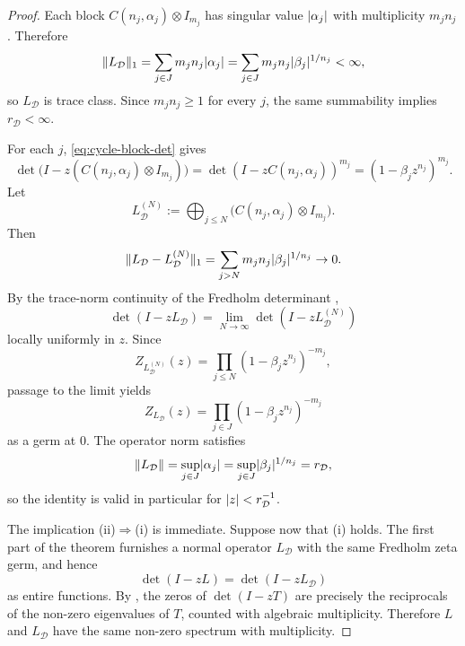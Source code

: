 \begin{proof}
  Each block \(C(n_j,\alpha_j)\otimes I_{m_j}\) has singular value
  \(\lvert \alpha_j \rvert\) with multiplicity \(m_jn_j\). Therefore
  \[
    \|L_{\mathcal D}\|_1
    =\sum_{j\in J}m_jn_j\lvert \alpha_j \rvert
    =\sum_{j\in J}m_jn_j\lvert \beta_j \rvert^{1/n_j}
    <\infty,
  \]
  so \(L_{\mathcal D}\) is trace class. Since \(m_jn_j\ge 1\) for every
  \(j\), the same summability implies
  \(
    r_{\mathcal D}<\infty
  \).

  For each \(j\), \eqref{eq:cycle-block-det} gives
  \[
    \det\!\bigl(I-z(C(n_j,\alpha_j)\otimes I_{m_j})\bigr)
    =\det(I-zC(n_j,\alpha_j))^{m_j}
    =(1-\beta_j z^{n_j})^{m_j}.
  \]
  Let
  \[
    L_{\mathcal D}^{(N)}
    :=\bigoplus_{j\le N}\bigl(C(n_j,\alpha_j)\otimes I_{m_j}\bigr).
  \]
  Then
  \[
    \|L_{\mathcal D}-L_{\mathcal D}^{(N)}\|_1
    =\sum_{j>N}m_jn_j\lvert \beta_j \rvert^{1/n_j}\to 0.
  \]
  By the trace-norm continuity of the Fredholm determinant
  \cite[Theorem~3.4]{Simon2005TraceIdeals},
  \[
    \det(I-zL_{\mathcal D})
    =\lim_{N\to\infty}\det(I-zL_{\mathcal D}^{(N)})
  \]
  locally uniformly in \(z\). Since
  \[
    Z_{L_{\mathcal D}^{(N)}}(z)
    =\prod_{j\le N}(1-\beta_j z^{n_j})^{-m_j},
  \]
  passage to the limit yields
  \[
    Z_{L_{\mathcal D}}(z)
    =\prod_{j\in J}(1-\beta_j z^{n_j})^{-m_j}
  \]
  as a germ at \(0\). The operator norm satisfies
  \[
    \|L_{\mathcal D}\|
    =\sup_{j\in J}\lvert \alpha_j \rvert
    =\sup_{j\in J}\lvert \beta_j \rvert^{1/n_j}
    =r_{\mathcal D},
  \]
  so the identity is valid in particular for \(\lvert z \rvert<r_{\mathcal D}^{-1}\).

  The implication \textup{(ii)}\(\Rightarrow\)\textup{(i)} is immediate.
  Suppose now that \textup{(i)} holds. The first part of the theorem
  furnishes a normal operator \(L_{\mathcal D}\) with the same Fredholm
  zeta germ, and hence
  \[
    \det(I-zL)=\det(I-zL_{\mathcal D})
  \]
  as entire functions. By \cite[Theorem~3.7]{Simon2005TraceIdeals}, the
  zeros of \(\det(I-zT)\) are precisely the reciprocals of the non-zero
  eigenvalues of \(T\), counted with algebraic multiplicity. Therefore
  \(L\) and \(L_{\mathcal D}\) have the same non-zero spectrum with
  multiplicity.


\end{proof}
